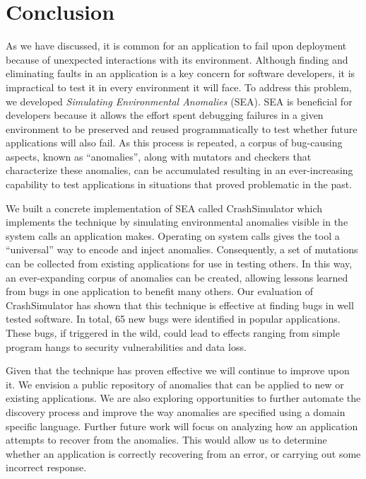 \section{Conclusion}
\label{SEC:conclusion}

As we have discussed,
it is common for an application
to fail upon deployment because of unexpected interactions
with its environment.
Although finding and eliminating
faults in an application is a key concern for software developers, it is
impractical to test it in every environment it will face.
To address this problem, we developed \textit{Simulating Environmental
Anomalies} (SEA).
SEA is beneficial for developers because it allows
the effort spent debugging failures in a given environment
to be preserved and reused programmatically to test whether
future applications will also fail.
As this process is repeated,
a corpus of bug-causing aspects,
known as ``anomalies'',
along with mutators and checkers that characterize these anomalies,
can be accumulated
resulting in an ever-increasing capability
to test applications in situations
that proved problematic in the past.

We built a concrete implementation of SEA
called CrashSimulator which implements
the technique by simulating environmental
anomalies visible in the system calls an application makes.
Operating on system calls gives the tool a ``universal'' way to
encode and inject anomalies. Consequently, a set of mutations can be
collected from existing applications for use in testing others.
In this way, an ever-expanding corpus of anomalies can be
created, allowing lessons learned from bugs in one application to benefit
many others.
Our evaluation of CrashSimulator
has shown that this technique is
effective at finding bugs in well tested software.
In total,
65 new bugs were identified in popular applications.
These bugs, if triggered in the wild,
could lead to effects ranging from simple program hangs
to security vulnerabilities and data loss.

Given that the technique has
proven effective we will continue to improve upon it.
We envision a public repository of anomalies
that can be applied to new or existing applications.
We are also exploring
opportunities to further automate the discovery process
and improve the way anomalies are specified using a
domain specific language.
Further future work
will focus on analyzing how an
application attempts
to recover from the anomalies.  This would allow
us to determine whether
an application is correctly recovering
from an error, or carrying out some incorrect response.
